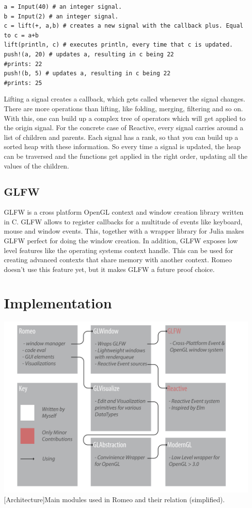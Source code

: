 \begin{lstlisting}
a = Input(40) # an integer signal.
b = Input(2) # an integer signal.
c = lift(+, a,b) # creates a new signal with the callback plus. Equal to c = a+b
lift(println, c) # executes println, every time that c is updated. 
push!(a, 20) # updates a, resulting in c being 22
#prints: 22
push!(b, 5) # updates a, resulting in c being 22
#prints: 25
\end{lstlisting}

Lifting a signal creates a callback, which gets called whenever the signal changes.
There are more operations than lifting, like folding, merging, filtering and so on.
With this, one can build up a complex tree of operators which will get applied to the origin signal.
For the concrete case of Reactive, every signal carries around a list of children and parents.
Each signal has a rank, so that you can build up a sorted heap with these information.
So every time a signal is updated, the heap can be traversed and the functions get applied in the right order, updating all the values of the children.

\subsection{GLFW}
GLFW is a cross platform \ac{OpenGL} context and window creation library written in C.
GLFW allows to register callbacks for a multitude of events like keyboard, mouse and window events.
This, together with a wrapper library for Julia makes GLFW perfect for doing the window creation.
In addition, GLFW exposes low level features like the operating systems context handle.
This can be used for creating advanced contexts that share memory with another context.
Romeo doesn't use this feature yet, but it makes GLFW a future proof choice.


\section{Implementation}


\vspace{1em}
\begin{minipage}{\linewidth}
    \centering
    \includegraphics[width=0.9\linewidth]{graphics/architecture.pdf}
    [Architecture]{Main modules used in Romeo and their relation (simplified).}
    \label{fig:architecture} 
\end{minipage}


